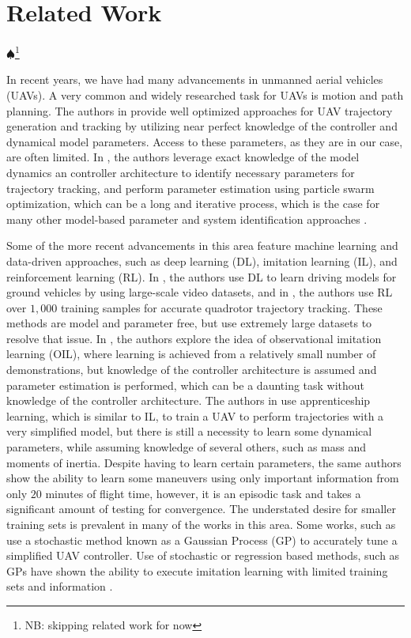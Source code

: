 \documentclass[letterpaper, 10 pt, conference]{ieeeconf}  %
\newcommand\NB[1]{$\spadesuit$\footnote{NB: #1}}
\begin{document}
\section{Related Work}
\NB{skipping related work for now}

In recent years, we have had many advancements in unmanned aerial vehicles (UAVs). A very common and widely researched task for UAVs is motion and path planning. The authors in \cite{minsnap,waypts,tvec} provide well optimized approaches for UAV trajectory generation and tracking by utilizing near perfect knowledge of the controller and dynamical model parameters. Access to these parameters, as they are in our case, are often limited. In \cite{pso}, the authors leverage exact knowledge of the model dynamics an controller architecture to identify necessary parameters for trajectory tracking, and perform parameter estimation using particle swarm optimization, which can be a long and iterative process, which is the case for many other model-based parameter and system identification approaches \cite{modelbased1,modelbased2}.

Some of the more recent advancements in this area feature machine learning and data-driven approaches, such as deep learning (DL), imitation learning (IL), and reinforcement learning (RL). In \cite{dln}, the authors use DL to learn driving models for ground vehicles by using large-scale video datasets, and in \cite{rlctrl}, the authors use RL over $1,000$ training samples for accurate quadrotor trajectory tracking. These methods are model and parameter free, but use extremely large datasets to resolve that issue. In \cite{uavrace}, the authors explore the idea of observational imitation learning (OIL), where learning is achieved from a relatively small number of demonstrations, but knowledge of the controller architecture is assumed and parameter estimation is performed, which can be a daunting task without knowledge of the controller architecture. The authors in \cite{abbeel} use apprenticeship learning, which is similar to IL, to train a UAV to perform trajectories with a very simplified model, but there is still a necessity to learn some dynamical parameters, while assuming knowledge of several others, such as mass and moments of inertia. Despite having to learn certain parameters, the same authors show the ability to learn some maneuvers using only important information from only $20$ minutes of flight time, however, it is an episodic task and takes a significant amount of testing for convergence. The understated desire for smaller training sets is prevalent in many of the works in this area. Some works, such as \cite{gppaper} use a stochastic method known as a Gaussian Process (GP) to accurately tune a simplified UAV controller. Use of stochastic or regression based methods, such as GPs have shown the ability to execute imitation learning with limited training sets and information \cite{imlerngp,imlernreg}.
\end{document}
